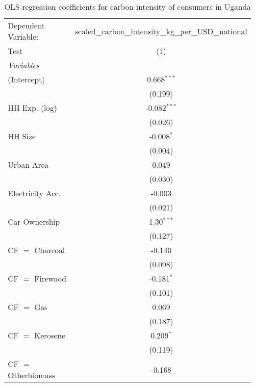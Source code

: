 
\begin{table}[htbp!]
   \centering
   \small
   \begin{adjustbox}{width = 1\textwidth, max height = 0.95\textheight, center}
      \begin{threeparttable}[b]
         \caption{\label{tab:OLS_1_UGA} OLS-regression coefficients for carbon intensity of consumers in Uganda}
         \begin{tabular}{lc}
            \tabularnewline \midrule \midrule
            Dependent Variable: & scaled\_carbon\_intensity\_kg\_per\_USD\_national\\        
            Test                & (1)\\  
            \midrule
            \emph{Variables}\\
            (Intercept)         & 0.668$^{***}$\\   
                                & (0.199)\\   
            HH Exp. (log)       & -0.082$^{***}$\\   
                                & (0.026)\\   
            HH Size             & -0.008$^{*}$\\   
                                & (0.004)\\   
            Urban Area          & 0.049\\   
                                & (0.030)\\   
            Electricity Acc.    & -0.003\\   
                                & (0.021)\\   
            Car Ownership       & 1.30$^{***}$\\   
                                & (0.127)\\   
            CF $=$ Charcoal     & -0.140\\   
                                & (0.098)\\   
            CF $=$ Firewood     & -0.181$^{*}$\\   
                                & (0.101)\\   
            CF $=$ Gas          & 0.069\\   
                                & (0.187)\\   
            CF $=$ Kerosene     & 0.209$^{*}$\\   
                                & (0.119)\\   
            CF $=$ Otherbiomass & -0.168\\   

\end{tabular}
\end{threeparttable}
\end{adjustbox}
\end{table}
